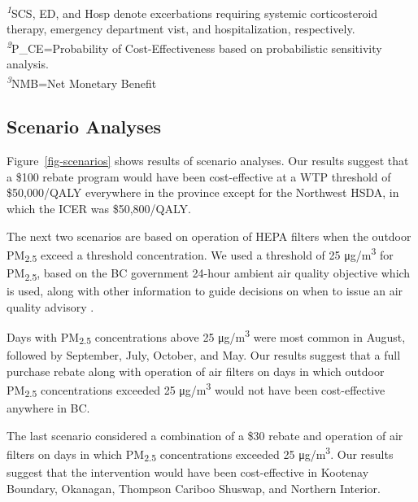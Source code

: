 \documentclass[
  number]{elsarticle}
\begin{document}
\begin{minipage}{\linewidth}
\textsuperscript{\textit{1}}SCS, ED, and Hosp denote excerbations requiring systemic corticosteroid therapy, emergency department vist, and hospitalization, respectively.\\
\textsuperscript{\textit{2}}P\_CE=Probability of Cost-Effectiveness based on probabilistic sensitivity analysis.\\
\textsuperscript{\textit{3}}NMB=Net Monetary Benefit\\
\end{minipage}

\hypertarget{scenario-analyses}{%
\subsection{Scenario Analyses}\label{scenario-analyses}}

Figure~\ref{fig-scenarios} shows results of scenario analyses. Our
results suggest that a \$100 rebate program would have been
cost-effective at a WTP threshold of \$50,000/QALY everywhere in the
province except for the Northwest HSDA, in which the ICER was
\$50,800/QALY.

The next two scenarios are based on operation of HEPA filters when the
outdoor PM\textsubscript{2.5} exceed a threshold concentration. We used
a threshold of 25 μg/m\textsuperscript{3} for PM\textsubscript{2.5},
based on the BC government 24-hour ambient air quality objective which
is used, along with other information to guide decisions on when to
issue an air quality advisory
\citep{ministryofenvironmentandclimatechangestrategy}.

Days with PM\textsubscript{2.5} concentrations above 25
μg/m\textsuperscript{3} were most common in August, followed by
September, July, October, and May. Our results suggest that a full
purchase rebate along with operation of air filters on days in which
outdoor PM\textsubscript{2.5} concentrations exceeded 25
μg/m\textsuperscript{3} would not have been cost-effective anywhere in
BC.

The last scenario considered a combination of a \$30 rebate and
operation of air filters on days in which PM\textsubscript{2.5}
concentrations exceeded 25 μg/m\textsuperscript{3}. Our results suggest
that the intervention would have been cost-effective in Kootenay
Boundary, Okanagan, Thompson Cariboo Shuswap, and Northern Interior.
\end{document}

